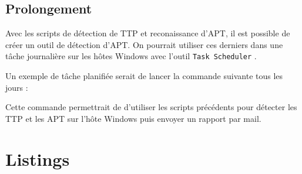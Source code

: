 \documentclass[12pt,letterpaper]{article}
\begin{document}
\subsection{Prolongement}

Avec les scripts de détection de TTP et reconaissance d'APT, il est possible de créer un outil de détection d'APT.
On pourrait utiliser ces derniers dans une tâche journalière sur les hôtes Windows avec l'outil \verb|Task Scheduler| \cite{mensHowCreatePowerShell2023}.

Un exemple de tâche planifiée serait de lancer la commande suivante tous les jours :


Cette commande permettrait de d'utiliser les scripts précédents pour détecter les TTP et les APT sur l'hôte Windows puis envoyer un rapport par mail.

\newpage
\section{Listings}




\newpage

\end{document}

